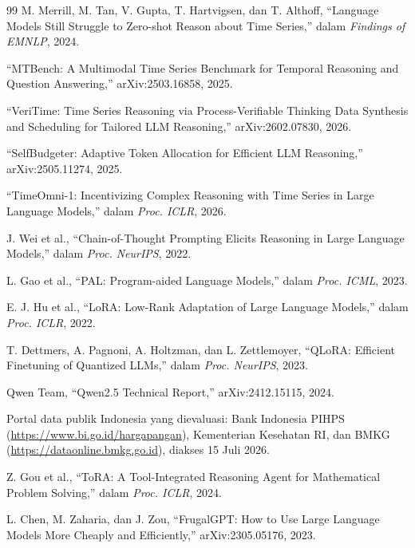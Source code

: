 \documentclass[10pt,a4paper,twocolumn]{article}
\begin{document}
\begin{thebibliography}{99}
\footnotesize
{}
M. Merrill, M. Tan, V. Gupta, T. Hartvigsen, dan T. Althoff, ``Language Models
Still Struggle to Zero-shot Reason about Time Series,'' dalam \textit{Findings
of EMNLP}, 2024.

``MTBench: A Multimodal Time Series Benchmark for Temporal Reasoning and
Question Answering,'' arXiv:2503.16858, 2025.

``VeriTime: Time Series Reasoning via Process-Verifiable Thinking Data Synthesis
and Scheduling for Tailored LLM Reasoning,'' arXiv:2602.07830, 2026.

``SelfBudgeter: Adaptive Token Allocation for Efficient LLM Reasoning,''
arXiv:2505.11274, 2025.

``TimeOmni-1: Incentivizing Complex Reasoning with Time Series in Large Language
Models,'' dalam \textit{Proc. ICLR}, 2026.

J. Wei et al., ``Chain-of-Thought Prompting Elicits Reasoning in Large Language
Models,'' dalam \textit{Proc. NeurIPS}, 2022.

L. Gao et al., ``PAL: Program-aided Language Models,'' dalam \textit{Proc.
ICML}, 2023.

E. J. Hu et al., ``LoRA: Low-Rank Adaptation of Large Language Models,'' dalam
\textit{Proc. ICLR}, 2022.

T. Dettmers, A. Pagnoni, A. Holtzman, dan L. Zettlemoyer, ``QLoRA: Efficient
Finetuning of Quantized LLMs,'' dalam \textit{Proc. NeurIPS}, 2023.

Qwen Team, ``Qwen2.5 Technical Report,'' arXiv:2412.15115, 2024.

Portal data publik Indonesia yang dievaluasi: Bank Indonesia PIHPS
(\url{https://www.bi.go.id/hargapangan}), Kementerian Kesehatan RI, dan BMKG
(\url{https://dataonline.bmkg.go.id}), diakses 15 Juli 2026.

Z. Gou et al., ``ToRA: A Tool-Integrated Reasoning Agent for Mathematical Problem
Solving,'' dalam \textit{Proc. ICLR}, 2024.

L. Chen, M. Zaharia, dan J. Zou, ``FrugalGPT: How to Use Large Language Models
More Cheaply and Efficiently,'' arXiv:2305.05176, 2023.


\end{thebibliography}
\end{document}

